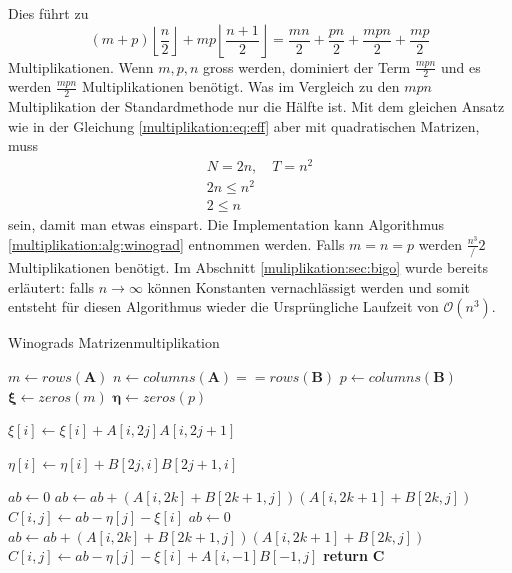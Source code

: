 Dies f\"uhrt zu
\begin{equation}
		(m+p) \left \lfloor \frac{n}{2} \right \rfloor + mp \left \lfloor \frac{n+1}{2} \right \rfloor = \frac{mn}{2} + \frac{pn}{2} + \frac{mpn}{2} + \frac{mp}{2}
\end{equation}
Multiplikationen.
Wenn $m,p,n$ gross werden, dominiert der Term $\frac{mpn}{2}$ und es werden $\frac{mpn}{2}$ Multiplikationen ben\"otigt.
Was im Vergleich zu den $mpn$ Multiplikation der Standardmethode nur die H\"alfte ist.
Mit dem gleichen Ansatz wie in der Gleichung \ref{multiplikation:eq:eff} aber mit quadratischen Matrizen, muss
\begin{equation}
	\begin{split}
N=2n, \quad T = n^2 \\
	2n \leq n^2 \\
	2 \leq n
\end{split}
\end{equation}
sein, damit man etwas einspart.
Die Implementation kann Algorithmus \ref{multiplikation:alg:winograd} entnommen werden.
Falls $m=n=p$ werden $\frac{n^3}/{2}$ Multiplikationen benötigt.
Im Abschnitt \ref{muliplikation:sec:bigo} wurde bereits erläutert: falls $n \rightarrow \infty$ können Konstanten vernachlässigt werden und
 somit entsteht für diesen Algorithmus wieder die Ursprüngliche Laufzeit von $\mathcal{O}(n^3 )$.
\begin{algorithm}\footnotesize\caption{Winograds Matrizenmultiplikation}
	\setlength{\lineskip}{7pt}
	\label{multiplikation:alg:winograd}
	\begin{algorithmic}
		\State  $ m \gets rows(\mathbf{A})$
		\State  $ n \gets columns(\mathbf{A}) == rows(\mathbf{B})$
		\State  $ p \gets columns(\mathbf{B})$
		\State  $ \mathbf{\xi} \gets zeros(m)$
		\State  $ \mathbf{\eta} \gets zeros(p)$


		\State $\xi[i] \gets \xi[i]+A[i,2 j]A[i,2 j+1]$
		\EndFor
		\EndFor

		\State $\eta[i] \gets   \eta[i]+B[2 j,i]B[2 j+1,i]$
		\EndFor
		\EndFor

		\State $ab \gets 0$
		\State $ab \gets ab + (A[i,2k]+B[2k+1,j])(A[i,2k+1]+B[2k,j])$
		\EndFor
		\State $C[i,j] \gets ab-\eta[j]-\xi[i]$
		\EndFor
		\EndFor
    \Else
		\State $ab \gets 0$
		\State $ab \gets ab + (A[i,2k]+B[2k+1,j])(A[i,2k+1]+B[2k,j])$
		\EndFor
		\State $C[i,j] \gets ab-\eta[j]-\xi[i]+A[i,-1]B[-1,j]$
		\EndFor
		\EndFor
		\EndIf
		\State \textbf{return} $\textbf{C}$

		\EndFunction
	\end{algorithmic}
\end{algorithm}


